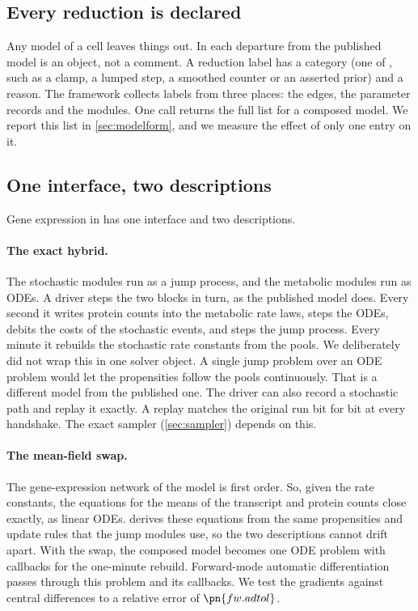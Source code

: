\subsection{Every reduction is declared}

Any model of a cell leaves things out. In \IC{} each departure from the published
model is an object, not a comment. A reduction label has a category (one of
, such as a clamp, a lumped step, a smoothed counter or an asserted
prior) and a reason. The framework collects labels from three places: the edges,
the parameter records and the modules. One call returns the full list for a
composed model. We report this list in \cref{sec:modelform}, and we measure the effect of only one entry on it.

\subsection{One interface, two descriptions}
\label{sec:twodesc}

Gene expression in \IC{} has one interface and two descriptions.

\paragraph{The exact hybrid.} The stochastic modules run as a jump process, and the
metabolic modules run as ODEs. A driver steps the two blocks in turn, as the
published model does. Every second it writes protein counts into the metabolic rate
laws, steps the ODEs, debits the costs of the stochastic events, and steps the jump
process. Every minute it rebuilds the stochastic rate constants from the pools. We deliberately did not wrap this in one solver object. A single jump problem over an ODE
problem would let the propensities follow the pools continuously. That is a
different model from the published one. The driver can also record a stochastic path
and replay it exactly. A replay matches the original run bit for bit at every
handshake. The exact sampler (\cref{sec:sampler}) depends on this.

\paragraph{The mean-field swap.} The gene-expression network of the model is first
order. So, given the rate constants, the equations for the means of the transcript and protein counts close exactly, as linear ODEs. \IC{} derives these equations from the same propensities
and update rules that the jump modules use, so the two descriptions cannot drift
apart. With the swap, the composed model becomes one ODE problem with callbacks for the
one-minute rebuild. Forward-mode automatic differentiation
\cite{revels2016forwardmode} passes through this problem and its callbacks. We test
the gradients against central differences to a relative error of $\pn{fw.adtol}$.

